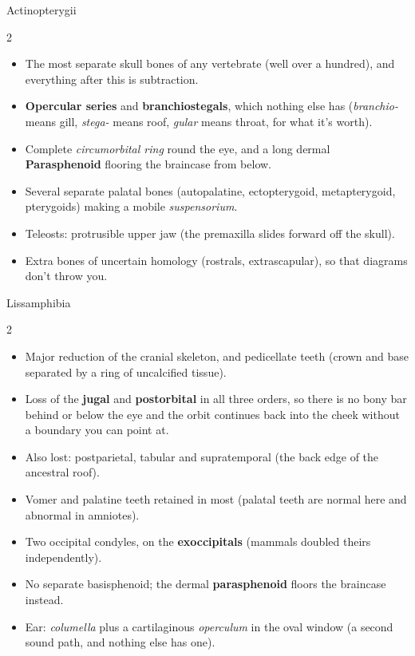 \documentclass[11pt]{article}
\newcommand{\bone}[1]{\textbf{#1}}
\newcommand{\term}[1]{\textsl{#1}}
\begin{document}
\begin{cladebox}{Actinopterygii}
\begin{multicols}{2}
\begin{itemize}
\item The most separate skull bones of any vertebrate (well over a hundred), and
  everything after this is subtraction.
\item \textbf{Opercular series} and \textbf{branchiostegals}, which nothing else has
  (\emph{branchio-} means gill, \emph{stega-} means roof, \emph{gular} means
  throat, for what it's worth).
\item Complete \term{circumorbital ring} round the eye, and a long dermal
  \bone{Parasphenoid} flooring the braincase from below.
\item Several separate palatal bones (autopalatine, ectopterygoid,
  metapterygoid, pterygoids) making a mobile \term{suspensorium}.
\item Teleosts: protrusible upper jaw (the premaxilla slides forward off the skull).
\item Extra bones of uncertain homology (rostrals, extrascapular), so that diagrams
  don't throw you.
\end{itemize}
\end{multicols}
\end{cladebox}

\begin{cladebox}{Lissamphibia}
\begin{multicols}{2}
\begin{itemize}
\item Major reduction of the cranial skeleton, and pedicellate teeth (crown and base
  separated by a ring of uncalcified tissue).
\item Loss of the \bone{jugal} and \bone{postorbital} in all three orders, so there is no bony bar behind or below the eye and the orbit continues back
  into the cheek without a boundary you can point at.
\item Also lost: postparietal, tabular and supratemporal (the back edge of the
  ancestral roof).
\item Vomer and palatine teeth retained in most (palatal teeth are normal here and
  abnormal in amniotes).
\item Two occipital condyles, on the \bone{exoccipitals} (mammals doubled theirs
  independently).
\item No separate basisphenoid; the dermal \bone{parasphenoid} floors the braincase
  instead.
\item Ear: \term{columella} plus a cartilaginous \term{operculum} in the oval window
  (a second sound path, and nothing else has one).
\end{itemize}
\end{multicols}
\end{cladebox}
\end{document}
